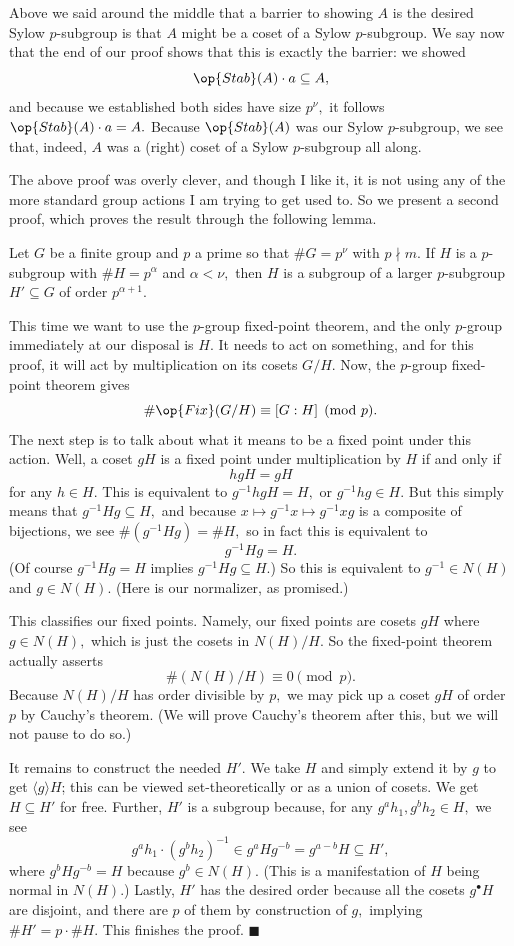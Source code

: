 Above we said around the middle that a barrier to showing $A$ is the desired Sylow $p$-subgroup is that $A$ might be a coset of a Sylow $p$-subgroup. We say now that the end of our proof shows that this is exactly the barrier: we showed
\[\op{Stab}(A)\cdot a\subseteq A,\]
and because we established both sides have size $p^\nu,$ it follows $\op{Stab}(A)\cdot a=A.$ Because $\op{Stab}(A)$ was our Sylow $p$-subgroup, we see that, indeed, $A$ was a (right) coset of a Sylow $p$-subgroup all along.

The above proof was overly clever, and though I like it, it is not using any of the more standard group actions I am trying to get used to. So we present a second proof, which proves the result through the following lemma.
\begin{lemma}
    Let $G$ be a finite group and $p$ a prime so that $\#G=p^\nu$ with $p\nmid m.$ If $H$ is a $p$-subgroup with $\#H=p^\alpha$ and $\alpha<\nu,$ then $H$ is a subgroup of a larger $p$-subgroup $H'\subseteq G$ of order $p^{\alpha+1}.$
\end{lemma}
This time we want to use the $p$-group fixed-point theorem, and the only $p$-group immediately at our disposal is $H.$ It needs to act on something, and for this proof, it will act by multiplication on its cosets $G/H.$ Now, the $p$-group fixed-point theorem gives
\[\#\op{Fix}(G/H)\equiv[G:H]\pmod p.\]
The next step is to talk about what it means to be a fixed point under this action. Well, a coset $gH$ is a fixed point under multiplication by $H$ if and only if
\[hgH=gH\]
for any $h\in H.$ This is equivalent to $g^{-1}hgH=H,$ or $g^{-1}hg\in H.$ But this simply means that $g^{-1}Hg\subseteq H,$ and because $x\mapsto g^{-1}x\mapsto g^{-1}xg$ is a composite of bijections, we see $\#\left(g^{-1}Hg\right)=\#H,$ so in fact this is equivalent to
\[g^{-1}Hg=H.\]
(Of course $g^{-1}Hg=H$ implies $g^{-1}Hg\subseteq H.$) So this is equivalent to $g^{-1}\in N(H)$ and $g\in N(H).$ (Here is our normalizer, as promised.)

This classifies our fixed points. Namely, our fixed points are cosets $gH$ where $g\in N(H),$ which is just the cosets in $N(H)/H.$ So the fixed-point theorem actually asserts
\[\#(N(H)/H)\equiv0\pmod p.\]
Because $N(H)/H$ has order divisible by $p,$ we may pick up a coset $gH$ of order $p$ by Cauchy's theorem. (We will prove Cauchy's theorem after this, but we will not pause to do so.)

It remains to construct the needed $H'.$ We take $H$ and simply extend it by $g$ to get $\langle g\rangle H$; this can be viewed set-theoretically or as a union of cosets. We get $H\subseteq H'$ for free. Further, $H'$ is a subgroup because, for any $g^ah_1,g^bh_2\in H,$ we see
\[g^ah_1\cdot\left(g^bh_2\right)^{-1}\in g^aHg^{-b}=g^{a-b}H\subseteq H',\]
where $g^bHg^{-b}=H$ because $g^b\in N(H).$ (This is a manifestation of $H$ being normal in $N(H).$) Lastly, $H'$ has the desired order because all the cosets $g^\bullet H$ are disjoint, and there are $p$ of them by construction of $g,$ implying $\#H'=p\cdot\#H.$ This finishes the proof. $\blacksquare$

